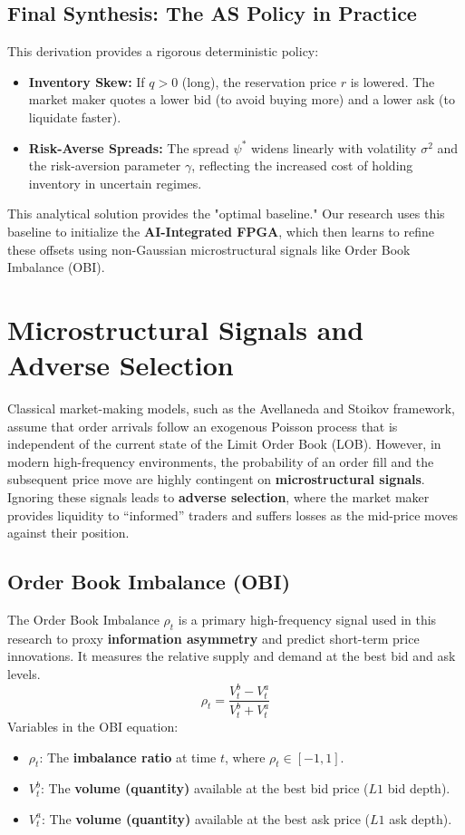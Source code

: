 \subsection{Final Synthesis: The AS Policy in Practice}
This derivation provides a rigorous deterministic policy:
\begin{itemize}
    \item \textbf{Inventory Skew:} If $q > 0$ (long), the reservation price $r$ is lowered. The market maker quotes a lower bid (to avoid buying more) and a lower ask (to liquidate faster).
    \item \textbf{Risk-Averse Spreads:} The spread $\psi^*$ widens linearly with volatility $\sigma^2$ and the risk-aversion parameter $\gamma$, reflecting the increased cost of holding inventory in uncertain regimes.
\end{itemize}
This analytical solution provides the "optimal baseline." Our research uses this baseline to initialize the \textbf{AI-Integrated FPGA}, which then learns to refine these offsets using non-Gaussian microstructural signals like Order Book Imbalance (OBI).

\section{Microstructural Signals and Adverse Selection}
Classical market-making models, such as the Avellaneda and Stoikov framework, assume that order arrivals follow an exogenous Poisson process that is independent of the current state of the Limit Order Book (LOB). However, in modern high-frequency environments, the probability of an order fill and the subsequent price move are highly contingent on \textbf{microstructural signals}. Ignoring these signals leads to \textbf{adverse selection}, where the market maker provides liquidity to ``informed'' traders and suffers losses as the mid-price moves against their position.

\subsection{Order Book Imbalance (OBI)}
The Order Book Imbalance $\rho_t$ is a primary high-frequency signal used in this research to proxy \textbf{information asymmetry} and predict short-term price innovations. It measures the relative supply and demand at the best bid and ask levels.
\begin{equation}
    \rho_t = \frac{V_t^b - V_t^a}{V_t^b + V_t^a}
\end{equation}
Variables in the OBI equation:
\begin{itemize}
    \item $\rho_t$: The \textbf{imbalance ratio} at time $t$, where $\rho_t \in [-1, 1]$.
    \item $V_t^b$: The \textbf{volume (quantity)} available at the best bid price ($L1$ bid depth).
    \item $V_t^a$: The \textbf{volume (quantity)} available at the best ask price ($L1$ ask depth).
\end{itemize}

